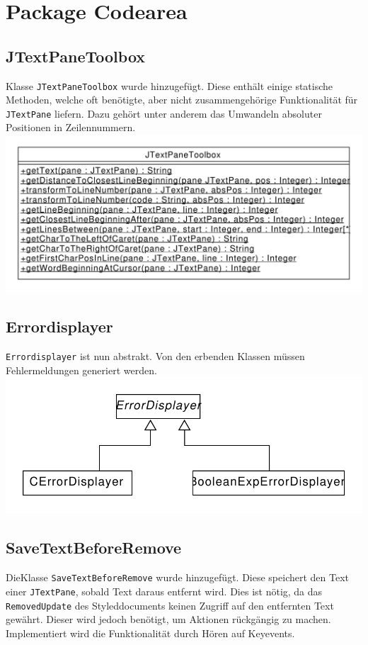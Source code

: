\documentclass[a4paper]{scrreprt}
\begin{document}
\section{Package Codearea}
\subsection{JTextPaneToolbox}
Klasse \verb!JTextPaneToolbox! wurde hinzugefügt. Diese enthält einige statische Methoden, welche oft benötigte, aber nicht zusammengehörige Funktionalität für \verb!JTextPane! liefern. Dazu gehört unter anderem das Umwandeln absoluter Positionen in Zeilennummern.\\
\includegraphics[scale=0.5]{JTextPaneToolbox.pdf}\\
\subsection{Errordisplayer}
\verb!Errordisplayer! ist nun abstrakt. Von den erbenden Klassen müssen Fehlermeldungen generiert werden.\\
\includegraphics[scale=0.5]{Errordisplayer_update.pdf}\\
\subsection{SaveTextBeforeRemove}
DieKlasse \verb!SaveTextBeforeRemove! wurde hinzugefügt. Diese speichert den Text einer \verb!JTextPane!, sobald Text daraus entfernt wird. Dies ist nötig, da das \verb!RemovedUpdate! des Styleddocuments keinen Zugriff auf den entfernten Text gewährt. Dieser wird jedoch benötigt, um Aktionen rückgängig zu machen. Implementiert wird die Funktionalität durch Hören auf Keyevents.\\
\end{document}
